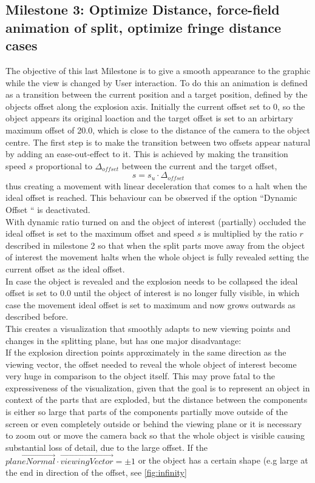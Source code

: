 \subsection{Milestone 3: Optimize Distance, force-field animation of split, optimize fringe distance cases} 
The objective of this last Milestone is to give a smooth appearance to the graphic while the view is changed by User interaction. To do this an animation is defined as a transition between the current position and a target position, defined by the objects offset along the explosion axis. Initially the current offset set to 0, so the object appears its original loaction and the target offset is set to an arbirtary maximum offset of 20.0, which is close to the distance of the camera to the object centre. The first step is to make the transition between two offsets appear natural by adding an ease-out-effect to it. This is achieved by making the transition speed $s$ proportional to $\Delta_{offset}$ between the current and the target offset, 
\begin{equation}
	s=s_u \cdot \Delta_{offset}
\end{equation}
thus creating a movement with linear deceleration that comes to a halt when the ideal offset is reached. This behaviour can be observed if the option ``Dynamic Offset `` is deactivated.\\
With dynamic ratio turned on and the object of interest (partially) occluded the ideal offset is set to the maximum offset and speed $s$ is multiplied by the ratio $r$ described in milestone 2 so that when the split parts move away from the object of interest the movement halts when the whole object is fully revealed setting the current offset as the ideal offset.\\
In case the object is revealed and the explosion needs to be collapsed the ideal offset is set to 0.0 until the object of interest is no longer fully visible, in which case the movement ideal offset is set to maximum and now grows outwards as described before.\\
This creates a visualization that smoothly adapts to new viewing points and changes in the splitting plane, but has one major disadvantage:\\
If the explosion direction points approximately in the same direction as the viewing vector,  the offset needed to reveal the whole object of interest become very huge in comparison to the object itself. This may prove fatal to the expressiveness of the visualization, given that the goal is to represent an object in context of the parts that are exploded, but the distance between the components is either so large that parts of the components partially move outside of the screen or even completely outside or behind the viewing plane or it is necessary to zoom out or move the camera back so that the whole object is visible causing substantial loss of detail, due to the large offset. If the $\vec{planeNormal} \cdot \vec{viewingVector} = \pm1$ or the object has a certain shape (e.g large at the end in direction of the offset, see  \ref{fig:infinity}
